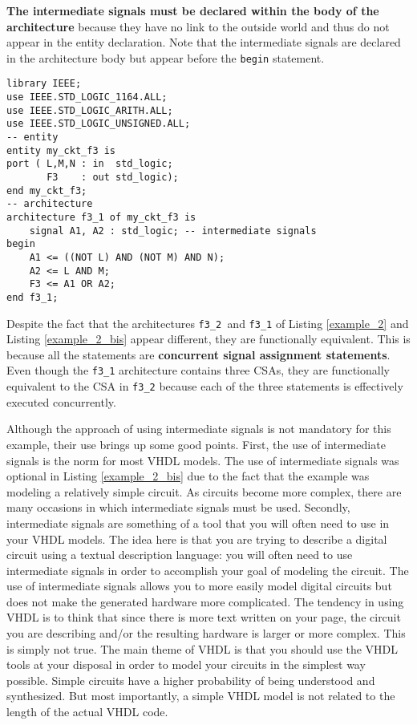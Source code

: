\textbf{The intermediate signals must be declared within the body of the architecture} because they have no link to the outside world and thus do not appear in the entity declaration. Note that the intermediate signals are declared in the architecture body but appear before the \texttt{begin} statement.
\begin{lstlisting}[label=example_2_bis, caption=Alternative solution of Example 2.]
library IEEE;
use IEEE.STD_LOGIC_1164.ALL;
use IEEE.STD_LOGIC_ARITH.ALL;
use IEEE.STD_LOGIC_UNSIGNED.ALL;
-- entity
entity my_ckt_f3 is
port ( L,M,N : in  std_logic;
       F3    : out std_logic);
end my_ckt_f3;
-- architecture
architecture f3_1 of my_ckt_f3 is
	signal A1, A2 : std_logic; -- intermediate signals
begin
	A1 <= ((NOT L) AND (NOT M) AND N);
	A2 <= L AND M;
	F3 <= A1 OR A2;
end f3_1;
\end{lstlisting}

Despite the fact that the architectures \texttt{f3\_2 }and \texttt{f3\_1} of Listing \ref{example_2} and Listing \ref{example_2_bis} appear different, they are functionally equivalent. This is because all the statements are \textbf{concurrent signal assignment statements}. Even though the \texttt{f3\_1} architecture contains three CSAs, they are functionally equivalent to the CSA in \texttt{f3\_2} because each of the three statements is effectively executed concurrently.

Although the approach of using intermediate signals is not mandatory for this example, their use brings up some good points. First, the use of intermediate signals is the norm for most VHDL models. The use of intermediate signals was optional in Listing \ref{example_2_bis} due to the fact that the example was modeling a relatively simple circuit. As circuits become more complex, there are many occasions in which intermediate signals must be used. Secondly, intermediate signals are something of a tool that you will often need to use in your VHDL models. The idea here is that you are trying to describe a digital circuit using a textual description language: you will often need to use intermediate signals in order to accomplish your goal of modeling the circuit. The use of intermediate signals allows you to more easily model digital circuits but does not make the generated hardware more complicated. The tendency in using VHDL is to think that since there is more text written on your page, the circuit you are describing and/or the resulting hardware is larger or more complex. This is simply not true. The main theme of VHDL is that you should use the VHDL tools at your disposal in order to model your circuits in the simplest way possible. Simple circuits have a higher probability of being understood and synthesized. But most importantly, a simple VHDL model is not related to the length of the actual VHDL code.

